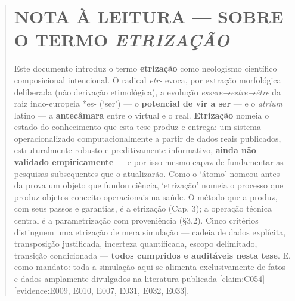 \documentclass[
  12pt,
]{report}
\begin{document}
\begin{quote}
\hypertarget{nota-uxe0-leitura-sobre-o-termo-etrizauxe7uxe3o}{%
\section{\texorpdfstring{NOTA À LEITURA --- SOBRE O TERMO
\emph{ETRIZAÇÃO}}{NOTA À LEITURA --- SOBRE O TERMO ETRIZAÇÃO}}\label{nota-uxe0-leitura-sobre-o-termo-etrizauxe7uxe3o}}

Este documento introduz o termo \textbf{etrização} como neologismo
científico composicional intencional. O radical \emph{etr-} evoca, por
extração morfológica deliberada (não derivação etimológica), a evolução
\emph{essere→estre→être} da raiz indo-europeia *es- (`ser') --- o
\textbf{potencial de vir a ser} --- e o \emph{atrium} latino --- a
\textbf{antecâmara} entre o virtual e o real. \textbf{Etrização} nomeia
o estado do conhecimento que esta tese produz e entrega: um sistema
operacionalizado computacionalmente a partir de dados reais publicados,
estruturalmente robusto e preditivamente informativo, \textbf{ainda não
validado empiricamente} --- e por isso mesmo capaz de fundamentar as
pesquisas subsequentes que o atualizarão. Como o `átomo' nomeou antes da
prova um objeto que fundou ciência, `etrização' nomeia o processo que
produz objetos-conceito operacionais na saúde. O método que a produz,
com seus passos e garantias, é a etrização (Cap. 3); a operação técnica
central é a parametrização com proveniência (§3.2). Cinco critérios
distinguem uma etrização de mera simulação --- cadeia de dados
explícita, transposição justificada, incerteza quantificada, escopo
delimitado, transição condicionada --- \textbf{todos cumpridos e
auditáveis nesta tese}. E, como mandato: toda a simulação aqui se
alimenta exclusivamente de fatos e dados amplamente divulgados na
literatura publicada {[}claim:C054{]} {[}evidence:E009, E010, E007,
E031, E032, E033{]}.
\end{quote}
\end{document}
